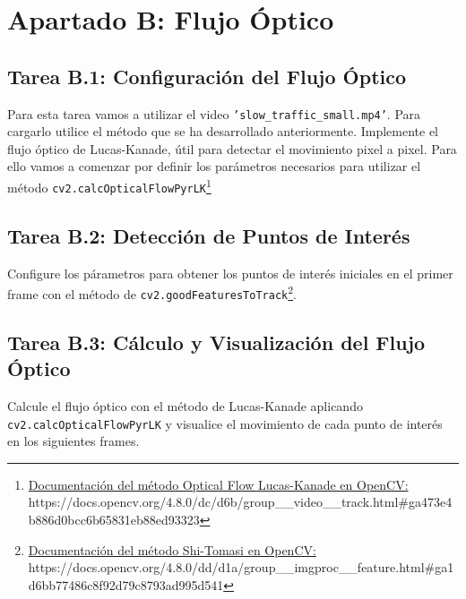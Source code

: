 \chapter{Apartado B: \textbf{Flujo Óptico}}
\label{chapter:tarea_b}

\section*{Tarea B.1: Configuración del Flujo Óptico}
{}
Para esta tarea vamos a utilizar el video \texttt{'slow\_traffic\_small.mp4'}. Para cargarlo utilice el método que se ha desarrollado anteriormente.
Implemente el flujo óptico de Lucas-Kanade, útil para detectar el movimiento pixel a pixel. Para ello vamos a comenzar por definir los parámetros necesarios para utilizar el método \texttt{cv2.calcOpticalFlowPyrLK}\footnote{ \href{https://docs.opencv.org/4.8.0/dc/d6b/group\_\_video\_\_track.html\#ga473e4b886d0bcc6b65831eb88ed93323}{Documentación del método Optical Flow Lucas-Kanade en OpenCV:} \\{https://docs.opencv.org/4.8.0/dc/d6b/group\_\_video\_\_track.html\#ga473e4b886d0bcc6b65831eb88ed93323}}

\section*{Tarea B.2: Detección de Puntos de Interés}
{}
Configure los párametros para obtener los puntos de interés iniciales en el primer frame con el método de \texttt{cv2.goodFeaturesToTrack}\footnote{ \href{https://docs.opencv.org/4.8.0/dd/d1a/group\_\_imgproc\_\_feature.html\#ga1d6bb77486c8f92d79c8793ad995d541}{Documentación del método Shi-Tomasi en OpenCV:} \\{https://docs.opencv.org/4.8.0/dd/d1a/group\_\_imgproc\_\_feature.html\#ga1d6bb77486c8f92d79c8793ad995d541}}.

\section*{Tarea B.3: Cálculo y Visualización del Flujo Óptico}
{}
Calcule el flujo óptico con el método de Lucas-Kanade aplicando \texttt{cv2.calcOpticalFlowPyrLK} y visualice el movimiento de cada punto de interés en los siguientes frames.

